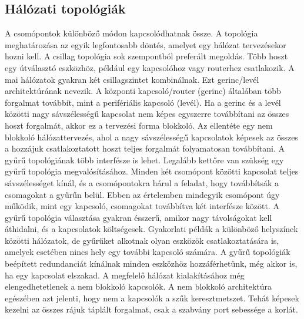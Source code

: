 \subsection{Hálózati topológiák}
A csomópontok különböző módon kapcsolódhatnak össze. A topológia meghatározása
az egyik legfontosabb döntés, amelyet egy hálózat tervezésekor hozni kell. A
csillag topológia sok szempontból preferált megoldás. Több hoszt egy
útválasztó eszközhöz, például egy kapcsolóhoz vagy routerhez csatlakozik. A mai
hálózatok gyakran két csillagszintet kombinálnak. Ezt gerinc/levél architektúrának
nevezik. A központi kapcsoló/router (gerinc) általában több forgalmat továbbít,
mint a perifériális kapcsoló (levél). Ha a gerinc és a levél közötti nagy sávszélességű
kapcsolat nem képes egyszerre továbbítani az összes hoszt forgalmát, akkor ez a
tervezési forma blokkoló. Az ellentéte egy nem blokkoló hálózattervezés, ahol a
nagy sávszélességű kapcsolatok képesek az összes a hozzájuk csatlakoztatott
hoszt teljes forgalmát folyamatosan továbbítani. 
A gyűrű topológiának több interfésze is lehet.
Legalább kettőre van szükség egy gyűrű topológia megvalósításához. Minden két
csomópont közötti kapcsolat teljes sávszélességet kínál, és a csomópontokra
hárul a feladat, hogy továbbítsák a csomagokat a gyűrűn belül. Ebben az
értelemben mindegyik csomópont úgy működik, mint egy kapcsoló, csomagokat
továbbítva két interfésze között. A gyűrű topológia választása gyakran ésszerű,
amikor nagy távolságokat kell áthidalni, és a kapcsolatok költségesek.
Gyakorlati példák a különböző helyszínek közötti hálózatok, de gyűrűket alkotnak
olyan eszközök csatlakoztatására is, amelyek esetében nincs hely egy további
kapcsoló számára. A gyűrű topológiák beépített redundanciát kínálnak minden
eszközhöz hozzáférhetünk, még akkor is, ha egy kapcsolat elszakad.
A megfelelő hálózat kialakításához még elengedhetetlenek a nem blokkoló kapcsolók.
A nem blokkoló architektúra egészében azt jelenti, hogy nem a kapcsolók a szűk keresztmetszet.
Tehát képesek kezelni az összes rájuk táplált forgalmat, csak a szabvány port sebessége a korlát.
